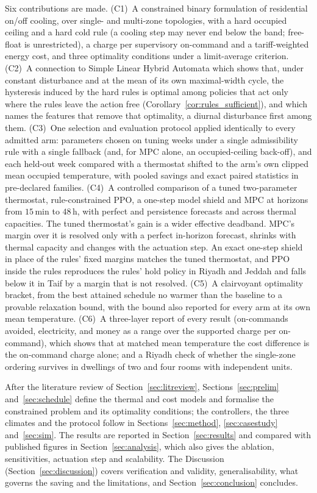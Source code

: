 \documentclass[pdflatex,sn-mathphys-num,iicol]{sn-jnl}
\theoremstyle{thmstyleone}\newtheorem{proposition}{Proposition}\newtheorem{corollary}{Corollary}
\theoremstyle{thmstyletwo}\newtheorem{remark}{Remark}\newtheorem{observation}{Observation}
\theoremstyle{thmstylethree}\newtheorem{definition}{Definition}
\begin{document}
Six contributions are made. (C1)~A constrained binary formulation of residential on/off cooling, over single- and multi-zone topologies, with a hard occupied ceiling and a hard cold rule (a cooling step may never end below the band; free-float is unrestricted), a charge per supervisory on-command and a tariff-weighted energy cost, and three optimality conditions under a limit-average criterion. (C2)~A connection to Simple Linear Hybrid Automata \citep{Mousa2016} which shows that, under constant disturbance and at the mean of its own maximal-width cycle, the hysteresis induced by the hard rules is optimal among policies that act only where the rules leave the action free (Corollary~\ref{cor:rules_sufficient}), and which names the features that remove that optimality, a diurnal disturbance first among them. (C3)~One selection and evaluation protocol applied identically to every admitted arm: parameters chosen on tuning weeks under a single admissibility rule with a single fallback (and, for MPC alone, an occupied-ceiling back-off), and each held-out week compared with a thermostat shifted to the arm's own clipped mean occupied temperature, with pooled savings and exact paired statistics in pre-declared families. (C4)~A controlled comparison of a tuned two-parameter thermostat, rule-constrained PPO, a one-step model shield and MPC at horizons from $15\,$min to $48\,$h, with perfect and persistence forecasts and across thermal capacities. The tuned thermostat's gain is a wider effective deadband. MPC's margin over it is resolved only with a perfect in-horizon forecast, shrinks with thermal capacity and changes with the actuation step. An exact one-step shield in place of the rules' fixed margins matches the tuned thermostat, and PPO inside the rules reproduces the rules' hold policy in Riyadh and Jeddah and falls below it in Taif by a margin that is not resolved. (C5)~A clairvoyant optimality bracket, from the best attained schedule no warmer than the baseline to a provable relaxation bound, with the bound also reported for every arm at its own mean temperature. (C6)~A three-layer report of every result (on-commands avoided, electricity, and money as a range over the supported charge per on-command), which shows that at matched mean temperature the cost difference is the on-command charge alone; and a Riyadh check of whether the single-zone ordering survives in dwellings of two and four rooms with independent units.

After the literature review of Section~\ref{sec:litreview}, Sections~\ref{sec:prelim} and~\ref{sec:schedule} define the thermal and cost models and formalise the constrained problem and its optimality conditions; the controllers, the three climates and the protocol follow in Sections~\ref{sec:method}, \ref{sec:casestudy} and~\ref{sec:sim}. The results are reported in Section~\ref{sec:results} and compared with published figures in Section~\ref{sec:analysis}, which also gives the ablation, sensitivities, actuation step and scalability. The Discussion (Section~\ref{sec:discussion}) covers verification and validity, generalisability, what governs the saving and the limitations, and Section~\ref{sec:conclusion} concludes.
 
\end{document}
